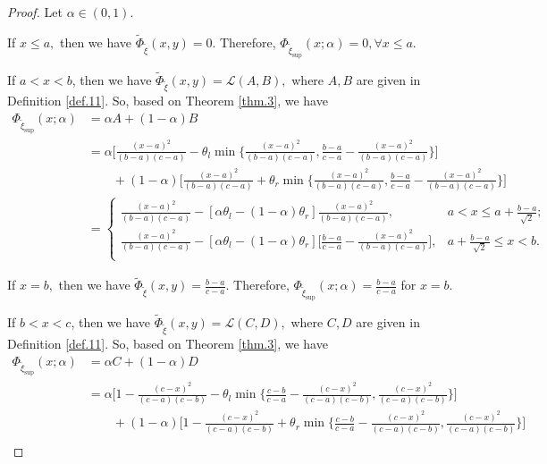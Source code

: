 \begin{proof}
	Let $\alpha\in (0,1)$. 
	
	\par If $x\leq a,$ then we have $\tilde{\Phi}_{\tilde{\xi}}(x,y)=0.$ Therefore, $\Phi_{\tilde{\xi}_{\sup}}(x;\alpha)=0,\forall x\leq a.$
	\par If $a< x< b$, then we have $\tilde{\Phi}_{\tilde{\xi}}(x,y)=\mathcal{L}(A,B),$ where $A,B$ are given in Definition \ref{def.11}. So, based on Theorem \ref{thm.3}, we have 
	\begin{equation*} 
		\begin{aligned}
			\Phi_{\tilde{\xi}_{\sup}}(x;\alpha)&=\alpha A+(1-\alpha)B\\
			&=\alpha \bigg[\frac{(x-a)^2}{(b-a)(c-a)}-\theta_l\min\bigg\{\frac{(x-a)^2}{(b-a)(c-a)},\frac{b-a}{c-a}-\frac{(x-a)^2}{(b-a)(c-a)}\bigg\}\bigg]\\
			&\qquad+(1-\alpha)\bigg[\frac{(x-a)^2}{(b-a)(c-a)}+\theta_r\min\bigg\{\frac{(x-a)^2}{(b-a)(c-a)},\frac{b-a}{c-a}-\frac{(x-a)^2}{(b-a)(c-a)}\bigg\}\bigg]\\
			& =\left\{
			\begin{array}{ll}
				\frac{(x-a)^2}{(b-a)(c-a)}-[\alpha\theta_l-(1-\alpha)\theta_r]\frac{(x-a)^2}{(b-a)(c-a)}, & a<x\leq a+\frac{b-a}{\sqrt{2}};\\
				\frac{(x-a)^2}{(b-a)(c-a)}-[\alpha\theta_l-(1-\alpha)\theta_r]\big[\frac{b-a}{c-a}-\frac{(x-a)^2}{(b-a)(c-a)}\big], & a+\frac{b-a}{\sqrt{2}}\leq x<b.\\
			\end{array}
			\right.
		\end{aligned}
	\end{equation*}
\par If $x=b,$ then we have $\tilde{\Phi}_{\tilde{\xi}}(x,y)=\frac{b-a}{c-a}.$ Therefore, $\Phi_{\tilde{\xi}_{\sup}}(x;\alpha)=\frac{b-a}{c-a}$ for $ x=b.$
\par If $b< x< c$, then we have $\tilde{\Phi}_{\tilde{\xi}}(x,y)=\mathcal{L}(C,D),$ where $C,D$ are given in Definition \ref{def.11}. So, based on Theorem \ref{thm.3}, we have 
\begin{equation*} 
	\begin{aligned}
		\Phi_{\tilde{\xi}_{\sup}}(x;\alpha)&=\alpha C+(1-\alpha)D\\
		&=\alpha \bigg[1-\frac{(c-x)^2}{(c-a)(c-b)}-\theta_l\min\bigg\{\frac{c-b}{c-a}-\frac{(c-x)^2}{(c-a)(c-b)}, \frac{(c-x)^2}{(c-a)(c-b)}\bigg\}\bigg]\\
		&\qquad+(1-\alpha)\bigg[1-\frac{(c-x)^2}{(c-a)(c-b)}+\theta_r\min\bigg\{\frac{c-b}{c-a}-\frac{(c-x)^2}{(c-a)(c-b)}, \frac{(c-x)^2}{(c-a)(c-b)}\bigg\}\bigg]\\

\end{aligned}
\end{equation*}
\end{proof}
